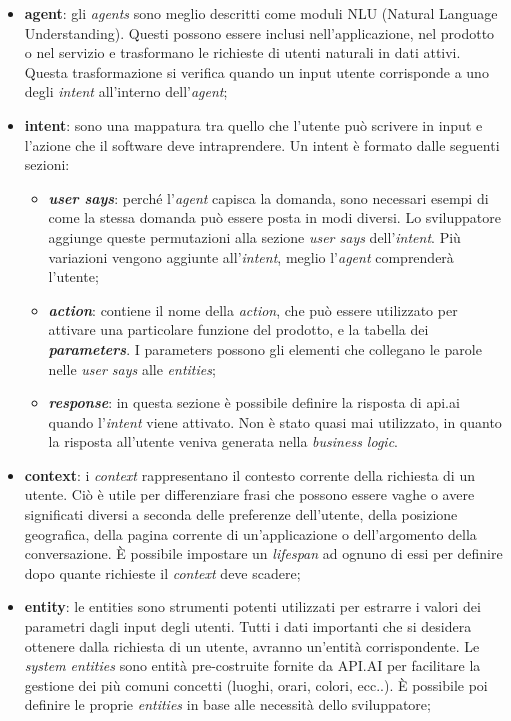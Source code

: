 \begin{itemize}
	\item \textbf{agent}: gli \emph{agents} sono meglio descritti come moduli NLU (Natural Language Understanding). Questi possono essere inclusi nell'applicazione, nel prodotto o nel servizio e trasformano le richieste di utenti naturali in dati attivi. Questa trasformazione si verifica quando un input utente corrisponde a uno degli \emph{intent} all'interno dell'\emph{agent};
	\item \textbf{intent}: sono una mappatura tra quello che l'utente può scrivere in input e l'azione che il software deve intraprendere. Un intent è formato dalle seguenti sezioni:
	\begin{itemize}
		\item\textbf{ \emph{user says}}: perché l'\emph{agent} capisca la domanda, sono necessari esempi di come la stessa domanda può essere posta in modi diversi. Lo sviluppatore aggiunge queste permutazioni alla sezione \emph{user says} dell'\emph{intent}. Più variazioni vengono aggiunte all'\emph{intent}, meglio l'\emph{agent} comprenderà l'utente;
		\item \textbf{\emph{action}}: contiene il nome della \emph{action}, che può essere utilizzato per attivare una particolare funzione del prodotto, e la tabella dei \textbf{\emph{parameters}}. I parameters possono gli elementi che collegano le parole nelle \emph{user says} alle \emph{entities};
		\item \textbf{\emph{response}}: in questa sezione è possibile definire la risposta di api.ai quando l'\emph{intent} viene attivato. Non è stato quasi mai utilizzato, in quanto la risposta all'utente veniva generata nella \emph{business logic}.
	\end{itemize}
	\item \textbf{context}: i \emph{context} rappresentano il contesto corrente della richiesta di un utente. Ciò è utile per differenziare frasi che possono essere vaghe o avere significati diversi a seconda delle preferenze dell'utente, della posizione geografica, della pagina corrente di un'applicazione o dell'argomento della conversazione. È possibile impostare un \emph{lifespan} ad ognuno di essi per definire dopo quante richieste il \emph{context} deve scadere;
	\item \textbf{entity}: le entities sono strumenti potenti utilizzati per estrarre i valori dei parametri dagli input degli utenti. Tutti i dati importanti che si desidera ottenere dalla richiesta di un utente, avranno un'entità corrispondente. Le \emph{system entities} sono entità pre-costruite fornite da API.AI per facilitare la gestione dei più comuni concetti (luoghi, orari, colori, ecc..). È possibile poi definire le proprie \emph{entities} in base alle necessità dello sviluppatore;
\end{itemize}


